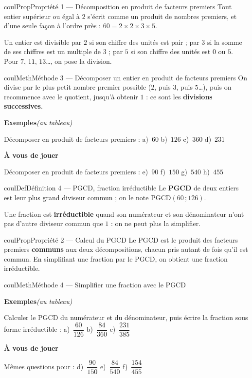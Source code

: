 \documentclass[11pt,a4paper]{article}
\makeatletter
\newcounter{lycee@signet}
\newcommand{\signet}[3][]{\stepcounter{lycee@signet}%
  \edef\lycee@dest{\if\relax\detokenize{#1}\relax
    signet.\arabic{lycee@signet}\else#1\fi}%
  \hypertarget{\lycee@dest}{}\bookmark[level=#2,dest=\lycee@dest]{#3}}
\newcounter{methode}
\newenvironment{definitionbox}[1][Définition]%
  {\begin{boitecours}[phantom={\signet{2}{#1}}]{coulDef}{#1}}{\end{boitecours}}
\newenvironment{proprietebox}[1][Propriété]%
  {\begin{boitecours}[phantom={\signet{2}{#1}}]{coulProp}{#1}}{\end{boitecours}}
\newenvironment{methodebox}[1][Méthode]{\stepcounter{methode}%
  \begin{boitecours}[phantom={\signet[methode-\arabic{methode}]{2}{#1}}]{coulMeth}{#1}}%
  {\end{boitecours}}
\newcommand{\etape}[1]{\par\smallskip\textbf{\color{coulMeth}#1}\par\nobreak\smallskip}
\newcommand{\autableau}{\hfill{\footnotesize\itshape\color{black!45}(au tableau)}}
\newcommand{\etapeexemples}{%
    \par\smallskip\textbf{\color{coulMeth}Exemples}\autableau\par\nobreak\smallskip}
\makeatother
\begin{document}
\begin{proprietebox}[Propriété 1 --- Décomposition en produit de facteurs premiers]
Tout entier supérieur ou égal à $2$ s'écrit comme un produit de nombres premiers, et
d'une seule façon à l'ordre près : $60=2\times 2\times 3\times 5$.
\end{proprietebox}

\begin{remarquebox}
Un entier est divisible par $2$ si son chiffre des unités est pair ; par $3$ si la somme
de ses chiffres est un multiple de $3$ ; par $5$ si son chiffre des unités est $0$ ou $5$.
Pour $7$, $11$, $13$\ldots, on pose la division.
\end{remarquebox}

\begin{methodebox}[Méthode 3 --- Décomposer un entier en produit de facteurs premiers]
On divise par le plus petit nombre premier possible ($2$, puis $3$, puis $5$\ldots), puis
on recommence avec le quotient, jusqu'à obtenir $1$ : ce sont les \textbf{divisions
successives}.
\etapeexemples
Décomposer en produit de facteurs premiers :
\quad a)~$60$ \qquad b)~$126$ \qquad c)~$360$ \qquad d)~$231$

\etape{À vous de jouer}
Décomposer en produit de facteurs premiers :
\quad e)~$90$ \qquad f)~$150$ \qquad g)~$540$ \qquad h)~$455$

\end{methodebox}

\begin{definitionbox}[Définition 4 --- PGCD, fraction irréductible]
Le \textbf{PGCD} de deux entiers est leur plus grand diviseur commun ; on le note
$\mathrm{PGCD}(60\,;126)$.

\smallskip
Une fraction est \textbf{irréductible} quand son numérateur et son dénominateur n'ont pas
d'autre diviseur commun que $1$ : on ne peut plus la simplifier.
\end{definitionbox}

\begin{proprietebox}[Propriété 2 --- Calcul du PGCD]
Le PGCD est le produit des facteurs premiers \textbf{communs} aux deux décompositions,
chacun pris autant de fois qu'il est commun. En simplifiant une fraction par le PGCD, on
obtient une fraction irréductible.
\end{proprietebox}

\begin{methodebox}[Méthode 4 --- Simplifier une fraction avec le PGCD]
\etapeexemples
Calculer le PGCD du numérateur et du dénominateur, puis écrire la fraction sous forme
irréductible :
\quad a)~$\dfrac{60}{126}$ \qquad b)~$\dfrac{84}{360}$ \qquad c)~$\dfrac{231}{385}$

\etape{À vous de jouer}
Mêmes questions pour :
\quad d)~$\dfrac{90}{150}$ \qquad e)~$\dfrac{84}{540}$ \qquad f)~$\dfrac{154}{455}$

\end{methodebox}
\end{document}
